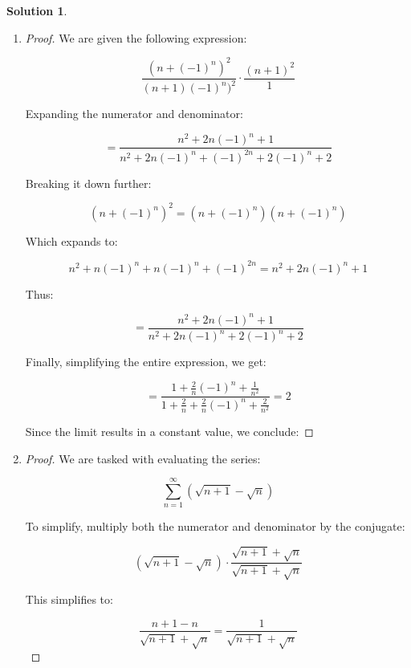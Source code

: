 \documentclass[12pt]{article}
\theoremstyle{definition} %
\newtheorem{solution}{Solution}
\theoremstyle{plain} %
\begin{document}
   \begin{solution}
      \begin{enumerate}
         \item \begin{proof}
            We are given the following expression:
      
      \[
      \frac{(n+(-1)^n)^2}{(n+1)(-1)^n)^2} \cdot \frac{(n+1)^2}{1}
      \]
      
      Expanding the numerator and denominator:
      
      \[
      = \frac{n^2 + 2n(-1)^n + 1}{n^2 + 2n(-1)^n + (-1)^{2n} + 2(-1)^n + 2}
      \]
      
      Breaking it down further:
      
      \[
      (n + (-1)^n)^2 = (n + (-1)^n)(n + (-1)^n)
      \]
      
      Which expands to:
      
      \[
      n^2 + n(-1)^n + n(-1)^n + (-1)^{2n} = n^2 + 2n(-1)^n + 1
      \]
      
      Thus:
      
      \[
      = \frac{n^2 + 2n(-1)^n + 1}{n^2 + 2n(-1)^n + 2(-1)^n + 2}
      \]
      
      Finally, simplifying the entire expression, we get:
      
      \[
      = \frac{1 + \frac{2}{n}(-1)^n + \frac{1}{n^2}}{1 + \frac{2}{n} + \frac{2}{n}(-1)^n + \frac{2}{n^2}} = 2
      \]
      
      Since the limit results in a constant value, we conclude:
      

         \end{proof}
      
      \item \begin{proof}
         We are tasked with evaluating the series:
      
      \[
      \sum_{n=1}^{\infty} \left( \sqrt{n+1} - \sqrt{n} \right)
      \]
      
      To simplify, multiply both the numerator and denominator by the conjugate:
      
      \[
      \left( \sqrt{n+1} - \sqrt{n} \right) \cdot \frac{\sqrt{n+1} + \sqrt{n}}{\sqrt{n+1} + \sqrt{n}}
      \]
      
      This simplifies to:
      
      \[
      \frac{n+1 - n}{\sqrt{n+1} + \sqrt{n}} = \frac{1}{\sqrt{n+1} + \sqrt{n}}
      \]
      

\end{proof}
\end{enumerate}
\end{solution}
\end{document}
